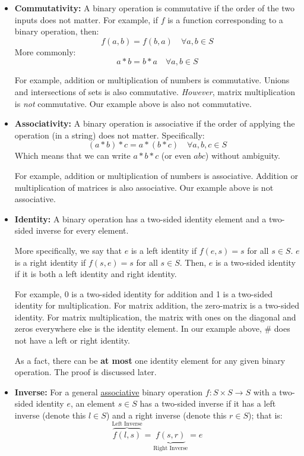 \documentclass[letterpaper]{article}
\begin{document}
\begin{itemize}
    \item \textbf{Commutativity:} A binary operation is commutative if the order of the two inputs does not matter. For example, if $f$ is a function corresponding to a binary operation, then:
    \[f(a, b) = f(b, a) \quad \forall a, b \in S\] 
    More commonly:
    \[a * b = b * a \quad \forall a, b \in S\]

    For example, addition or multiplication of numbers is commutative. Unions and intersections of sets is also commutative. \emph{However}, matrix multiplication is \emph{not} commutative. Our example above is also not commutative. 

    \item \textbf{Associativity:} A binary operation is associative if the order of applying the operation (in a string) does not matter. Specifically:
    \[(a * b) * c = a * (b * c) \quad \forall a, b, c \in S\]
    Which means that we can write $a * b * c$ (or even $abc$) without ambiguity.
    
    \bigskip 

    For example, addition or multiplication of numbers is associative. Addition or multiplication of matrices is also associative. Our example above is not associative. 

    \item \textbf{Identity:} A binary operation has a two-sided identity element and a two-sided inverse for every element. 
    
    \bigskip 
    
    More specifically, we say that $e$ is a left identity if $f(e, s) = s$ for all $s \in S$. $e$ is a right identity if $f(s, e) = s$ for all $s \in S$. Then, $e$ is a two-sided identity if it is both a left identity and right identity.  
    
    \bigskip 

    For example, 0 is a two-sided identity for addition and 1 is a two-sided identity for multiplication. For matrix addition, the zero-matrix is a two-sided identity. For matrix multiplication, the matrix with ones on the diagonal and zeros everywhere else is the identity element. In our example above, $\#$ does not have a left or right identity. 

    \bigskip 

    As a fact, there can be \textbf{at most} one identity element for any given binary operation. The proof is discussed later. 

    \item \textbf{Inverse:} For a general \underline{associative} binary operation $f: S \times S \to S$ with a two-sided identity $e$, an element $s \in S$ has a two-sided inverse if it has a left inverse (denote this $l \in S$) and a right inverse (denote this $r \in S$); that is: 
    \[\overbrace{f(l, s)}^{\text{Left Inverse}} = \underbrace{f(s, r)}_{\text{Right Inverse}} = e\]


\end{itemize}
\end{document}

